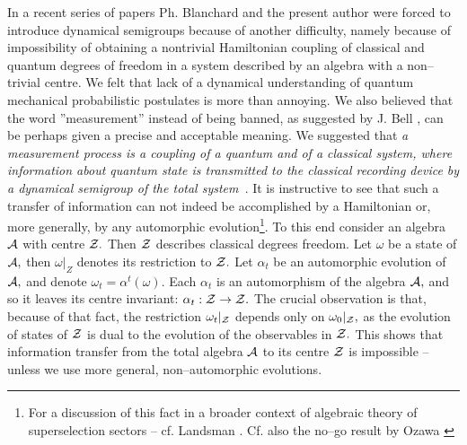 \documentclass[12pt]{article}
\begin{document}
In a recent series of papers \cite{bla1,bla2,bla3,bla4} Ph. Blanchard and
the present author were forced to introduce dynamical semigroups because of
another difficulty,  namely because of  impossibility of obtaining 
a nontrivial Hamiltonian
coupling of classical and quantum degrees of freedom in a system described
by an algebra with a non--trivial centre.  We felt that lack of a
dynamical understanding of quantum mechanical probabilistic postulates is
more than annoying.  We also believed that the word ''measurement'' instead 
of being
banned,  as suggested by J.  Bell \cite{bel1,bel2},  can be perhaps given a precise
and acceptable meaning.  We suggested that {\sl a measurement process is a 
coupling of a
quantum and of a classical system,  where information about quantum state is
transmitted to the classical recording device by a dynamical semigroup of
the total system\ }.  It is instructive to see that such a transfer of
information can not indeed be accomplished by a Hamiltonian or,  more generally, 
 by
any automorphic evolution\footnote{For a discussion of this fact in a broader 
context
of algebraic theory of superselection sectors -- cf. 
Landsman \cite[Sec. 4. 4]{lan}. Cf. also the no--go result by 
Ozawa \cite{oza}}.  To this end consider an algebra ${\cal A}$ with
centre ${\cal Z}. $ Then ${\cal Z}$ describes classical degrees freedom.  Let 
$\omega $ be a state of ${\cal A}, $ then ${\omega}|_Z$ denotes its
restriction to ${\cal Z}. $ Let $\alpha _t$ be an automorphic evolution of $
{\cal A}, $ and denote $\omega _t=\alpha ^t (\omega ). $ Each $\alpha _t$ is
an automorphism of the algebra ${\cal A} , $  and so it leaves its centre 
invariant:  
$\alpha _t: {\cal Z}\rightarrow {\cal Z}. $ The crucial observation is that,
because of that fact,  the restriction ${\omega _t}|_{{\cal Z}}$ depends only 
on ${
\omega _0}|_{{\cal Z}}, $ as the evolution of states of ${\cal Z}$ is dual to
the evolution of the observables in ${\cal Z}. $ This shows that information
transfer from the total algebra ${\cal A}$ to its centre ${\cal Z}$ is
impossible -- unless we use more general,  non--automorphic evolutions.
\end{document}
